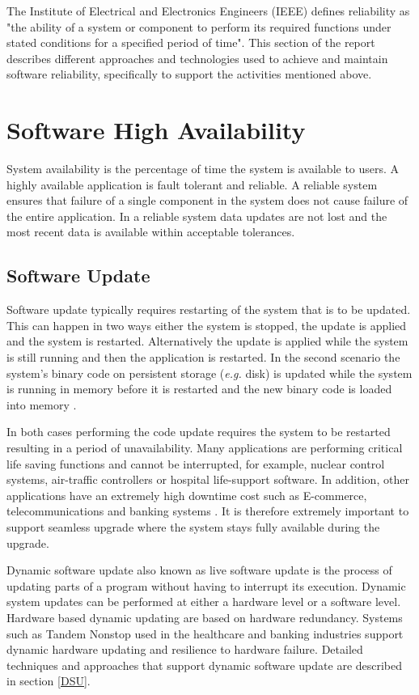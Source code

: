 \documentclass[a4paper,11pt,twoside]{report}
\begin{document}
\noindent
The Institute of Electrical and Electronics Engineers (IEEE) defines reliability as "the ability of a system or component to perform its required functions under stated conditions for a specified period of time". 
This section of the report describes different approaches and technologies used to achieve and maintain software reliability, specifically to support the activities mentioned above. 

\section{Software High Availability }\label{subsec:rules}
System availability is the percentage of time the system is available to users. A highly available application is fault tolerant and reliable. A reliable system ensures that failure of a single component in the system does not cause failure of the entire application. In a reliable system data updates are not lost and the most recent data is available within acceptable tolerances. 


\subsection*{Software Update} 
Software update typically requires restarting of the system that is to be updated. This can happen in two ways either the system is stopped, the update is applied and the system is restarted. Alternatively the update is applied while the system is still running and then the application is restarted. In the second scenario the system's binary code on persistent storage (\textit{e.g.} disk) is updated while the system is running in memory before it is restarted and the new binary code is loaded into memory \cite{Java}. 

In both cases performing the code update requires the system to be restarted resulting in a period of unavailability. Many applications are performing critical life saving functions and cannot be interrupted, for example, nuclear control systems, air-traffic controllers or hospital life-support software. In addition, other applications have an extremely high downtime cost such as E-commerce, telecommunications and banking systems \cite{fly}. It is therefore extremely important to support seamless upgrade where the system stays fully available during the upgrade. 

Dynamic software update also known as live software update is the process of updating parts of a program without having to interrupt its execution. Dynamic system updates can be performed at either a hardware level or a software level. Hardware based dynamic updating are based on hardware redundancy. Systems such as Tandem Nonstop \cite{Tandem} used in the healthcare and banking industries support dynamic hardware updating and resilience to hardware failure. Detailed techniques and approaches that support dynamic software update are described in section \ref{DSU}. 
\end{document}
